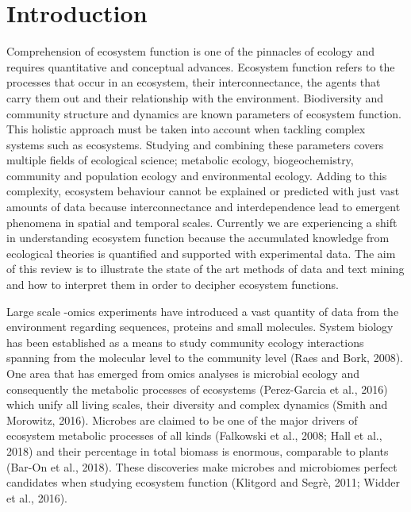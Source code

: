 % 
% 


\chapter{Introduction}
\label{cha:intro}


Comprehension of ecosystem function is one of the pinnacles of ecology and
requires quantitative and conceptual advances. Ecosystem function refers to the
processes that occur in an ecosystem, their interconnectance, the agents that
carry them out and their relationship with the environment. Biodiversity \citep{hooperEFFECTSBIODIVERSITYECOSYSTEM2005, loreau2001Biodiversity}
and community structure and dynamics \citep{gonze2018Microbial,morris2020Linking}
are known parameters of ecosystem function. This holistic approach must be taken
into account when tackling complex systems such as ecosystems. Studying and
combining these parameters covers multiple fields of ecological science;
metabolic ecology, biogeochemistry, community and population ecology and environmental ecology. Adding to this complexity, ecosystem behaviour cannot be explained or predicted with just vast amounts of data because interconnectance and interdependence lead to emergent phenomena in spatial and temporal scales. Currently we are experiencing a shift in understanding ecosystem function because the accumulated knowledge from ecological theories is quantified and supported with experimental data. The aim of this review is to illustrate the state of the art methods of data and text mining and how to interpret them in order to decipher ecosystem functions.

Large scale -omics experiments have introduced a vast quantity of data from the environment regarding sequences, proteins and small molecules. System biology has been established as a means to study community ecology interactions spanning from the molecular level to the community level (Raes and Bork, 2008). One area that has emerged from omics analyses is microbial ecology and consequently the metabolic processes of ecosystems (Perez-Garcia et al., 2016) which unify all living scales, their diversity and complex dynamics (Smith and Morowitz, 2016). Microbes are claimed to be one of the major drivers of ecosystem metabolic processes of all kinds (Falkowski et al., 2008; Hall et al., 2018) and their percentage in total biomass is enormous, comparable to plants (Bar-On et al., 2018). These discoveries make microbes and microbiomes perfect candidates when studying ecosystem function (Klitgord and Segrè, 2011; Widder et al., 2016).

